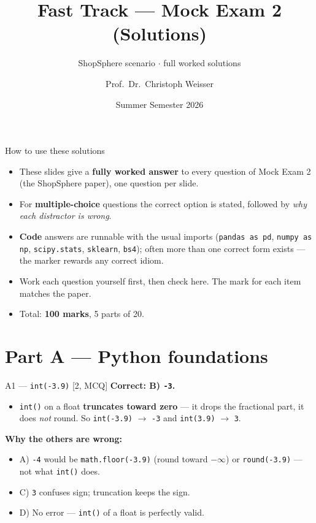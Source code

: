 \documentclass[aspectratio=169,11pt]{beamer}
\title{Fast Track --- Mock Exam 2 (Solutions)}
\subtitle{ShopSphere scenario $\cdot$ full worked solutions}
\author{Prof.\ Dr.\ Christoph Weisser}
\institute{HSBI}
\date{Summer Semester 2026}
\begin{document}
\begin{frame}\titlepage\end{frame}

\begin{frame}{How to use these solutions}
\begin{itemize}
  \item These slides give a \textbf{fully worked answer} to every question of Mock Exam 2 (the ShopSphere paper), one question per slide.
  \item For \textbf{multiple-choice} questions the correct option is stated, followed by \emph{why each distractor is wrong}.
  \item \textbf{Code} answers are runnable with the usual imports (\texttt{pandas as pd}, \texttt{numpy as np}, \texttt{scipy.stats}, \texttt{sklearn}, \texttt{bs4}); often more than one correct form exists --- the marker rewards any correct idiom.
  \item Work each question yourself first, then check here. The mark for each item matches the paper.
  \item Total: \textbf{100 marks}, 5 parts of 20.
\end{itemize}
\end{frame}

\section{Part A --- Python foundations}

\begin{frame}[fragile]{A1 --- \texttt{int(-3.9)} \hfill [2, MCQ]}
\textbf{Correct: B) \texttt{-3}.}
\begin{itemize}
  \item \texttt{int()} on a float \textbf{truncates toward zero} --- it drops the fractional part, it does \emph{not} round. So \texttt{int(-3.9)} $\to$ \texttt{-3} and \texttt{int(3.9)} $\to$ \texttt{3}.
\end{itemize}
\textbf{Why the others are wrong:}
\begin{itemize}
  \item A) \texttt{-4} would be \texttt{math.floor(-3.9)} (round toward $-\infty$) or \texttt{round(-3.9)} --- not what \texttt{int()} does.
  \item C) \texttt{3} confuses sign; truncation keeps the sign.
  \item D) No error --- \texttt{int()} of a float is perfectly valid.
\end{itemize}
\end{frame}
\end{document}
